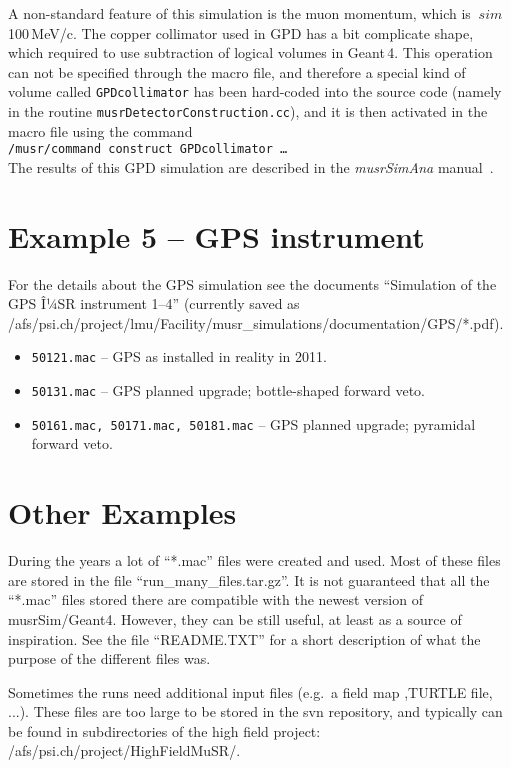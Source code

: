 \documentclass[twoside]{dis04}
\begin{document}
%
A non-standard feature of this simulation is the muon momentum, which is $~sim$100\,MeV/c.
The copper collimator used in GPD has a bit complicate shape, which required to use subtraction
of logical volumes in Geant\,4.  This operation can not be specified through the macro file,
and therefore a special kind of volume called {\tt GPDcollimator} has been hard-coded into
the source code (namely in the routine {\tt musrDetectorConstruction.cc}), and it is
then activated in the macro file using the command \\[2ex]
{\tt /musr/command construct GPDcollimator \ldots}\\[2ex]
%
The results of this GPD simulation are described in the \emph{musrSimAna} manual~\cite{musrSimAna}.

\section{Example 5 -- GPS instrument}
For the details about the GPS simulation see the documents 
``Simulation of the GPS Î¼SR instrument 1--4'' (currently saved as
/afs/psi.ch/project/lmu/Facility/musr\_simulations/documentation/GPS/*.pdf).
\begin{itemize}
  \item {\tt 50121.mac} -- GPS as installed in reality in 2011.
  \item {\tt 50131.mac} -- GPS planned upgrade; bottle-shaped forward veto.
  \item {\tt 50161.mac, 50171.mac, 50181.mac} -- GPS planned upgrade; pyramidal forward veto.
\end{itemize}
\section{Other Examples}
During the years a lot of ``*.mac'' files were created and used.
Most of these files are stored in the file ``run\_many\_files.tar.gz''.
It is not guaranteed that all the ``*.mac'' files stored there are
compatible with the newest version of musrSim/Geant4.  However,
they can be still useful, at least as a source of inspiration.
See the file ``README.TXT'' for a short description of what the purpose
of the different files was.

Sometimes the runs need additional input files (e.g.\ a field map
,TURTLE file, ...).  These files are too large to be stored in the svn repository,
and typically can be found in subdirectories of the high field project:
/afs/psi.ch/project/HighFieldMuSR/.
\end{document}
